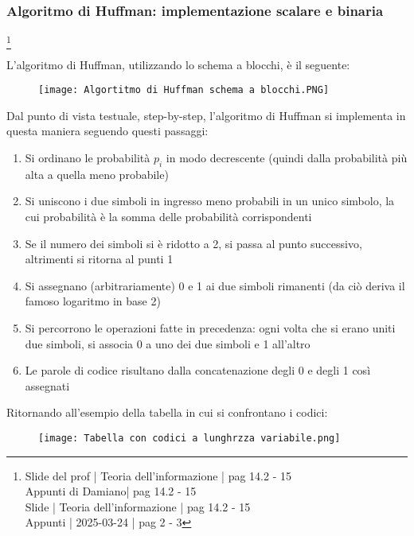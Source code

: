 \newpage 

\subsubsection{Algoritmo di Huffman: implementazione scalare e binaria}
\footnote{Slide del prof | Teoria dell'informazione | pag 14.2 - 15 \\  
Appunti di Damiano| pag 14.2 - 15 \\
Slide | Teoria dell'informazione | pag 14.2 - 15 \\
Appunti | 2025-03-24 | pag 2 - 3
}

L'algoritmo di Huffman, utilizzando lo schema a blocchi, è il seguente: 

\begin{figure}[h]
    \centering
    \texttt{[image: Algortitmo di Huffman schema a blocchi.PNG]}
\end{figure} 

Dal punto di vista testuale, step-by-step, 
l'algoritmo di Huffman si implementa in questa maniera seguendo questi passaggi: 

\begin{enumerate}
    \item Si ordinano le probabilità $p_i$ in modo decrescente (quindi dalla probabilità più alta a quella meno probabile)
    \item Si uniscono i due simboli in ingresso meno probabili in un unico simbolo, la cui probabilità è la somma delle probabilità corrispondenti 
    \item Se il numero dei simboli si è ridotto a 2, si passa al punto successivo, altrimenti si ritorna al punti 1 
    \item Si assegnano (arbitrariamente) 0 e 1 ai due simboli rimanenti (da ciò deriva il famoso logaritmo in base 2) 
    \item Si percorrono le operazioni fatte in precedenza: ogni volta che si erano uniti due simboli, si associa 0 a uno dei due simboli e 1 all'altro 
    \item Le parole di codice risultano dalla concatenazione degli 0 e degli 1 così assegnati
\end{enumerate}

\newpage 

Ritornando all'esempio della tabella in cui si confrontano i codici: 

\begin{figure}[h]
    \centering
    \texttt{[image: Tabella con codici a lunghrzza variabile.png]}
\end{figure} 

